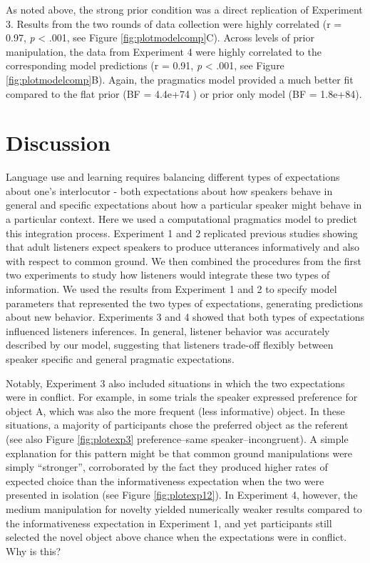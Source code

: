 \documentclass[10pt, letterpaper]{article}
\begin{document}
As noted above, the strong prior condition was a direct replication of
Experiment 3. Results from the two rounds of data collection were highly
correlated (r = 0.97, \emph{p} \textless{} .001, see Figure
\ref{fig:plotmodelcomp}C). Across levels of prior manipulation, the data
from Experiment 4 were highly correlated to the corresponding model
predictions (r = 0.91, \emph{p} \textless{} .001, see Figure
\ref{fig:plotmodelcomp}B). Again, the pragmatics model provided a much
better fit compared to the flat prior (BF = 4.4e+74 ) or prior only
model (BF = 1.8e+84).

\section{Discussion}\label{discussion}

Language use and learning requires balancing different types of
expectations about one's interlocutor - both expectations about how
speakers behave in general and specific expectations about how a
particular speaker might behave in a particular context. Here we used a
computational pragmatics model to predict this integration process.
Experiment 1 and 2 replicated previous studies showing that adult
listeners expect speakers to produce utterances informatively and also
with respect to common ground. We then combined the procedures from the
first two experiments to study how listeners would integrate these two
types of information. We used the results from Experiment 1 and 2 to
specify model parameters that represented the two types of expectations,
generating predictions about new behavior. Experiments 3 and 4 showed
that both types of expectations influenced listeners inferences. In
general, listener behavior was accurately described by our model,
suggesting that listeners trade-off flexibly between speaker specific
and general pragmatic expectations.

Notably, Experiment 3 also included situations in which the two
expectations were in conflict. For example, in some trials the speaker
expressed preference for object A, which was also the more frequent
(less informative) object. In these situations, a majority of
participants chose the preferred object as the referent (see also Figure
\ref{fig:plotexp3} preference--same speaker--incongruent). A simple
explanation for this pattern might be that common ground manipulations
were simply ``stronger'', corroborated by the fact they produced higher
rates of expected choice than the informativeness expectation when the
two were presented in isolation (see Figure \ref{fig:plotexp12}). In
Experiment 4, however, the medium manipulation for novelty yielded
numerically weaker results compared to the informativeness expectation
in Experiment 1, and yet participants still selected the novel object
above chance when the expectations were in conflict. Why is this?
\end{document}
